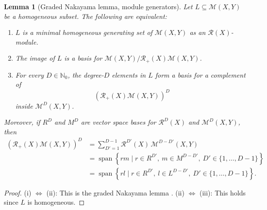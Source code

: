 \documentclass[11pt]{article}
\newcommand{\dsN}{\mathbb{N}}
\newcommand{\scM}{\mathcal{M}}
\newcommand{\scR}{\mathcal{R}}
\newcommand{\Span}{\operatorname{span}}
\newcommand{\set}[1]{\{#1\}}
\newtheorem{lemma}[theorem]{Lemma}
\theoremstyle{definition}
\begin{document}
\begin{lemma}[Graded Nakayama lemma, module generators]\label{lem:module-generators}
  Let $L\subseteq \scM(X,Y)$ be a homogeneous subset. The following are equivalent:
  \begin{enumerate}[label=\textup{(\roman*)}, leftmargin=2em]
    \item $L$ is a minimal homogeneous generating set of $\scM(X,Y)$ as an $\scR(X)$-module.
    \item The image of $L$ is a basis for $\scM(X,Y)\big/\scR_{+}(X)\scM(X,Y)$.
    \item For every $D\in\dsN_0$, the degree-$D$ elements in $L$ form a basis for a complement of
    \[
      \left(\scR_{+}(X)\scM(X,Y)\right)^D
    \]
    inside $\scM^D(X,Y)$.
  \end{enumerate}
  Moreover, if $R^D$ and $M^D$ are vector space bases for $\scR^{D}(X)$ and $\scM^D(X,Y)$, then
  \[
    \begin{aligned}
      \left(\scR_{+}(X)\scM(X,Y)\right)^D
      &=
      \sum_{D'=1}^{D-1} \scR^{D'}(X)\,\scM^{D-D'}(X,Y) \\
      &=
      \Span\left\{r m \mid r \in R^{D'},\ m \in M^{D-D'},\ D' \in \set{1,\dots,D-1}\right\} \\
      &=
      \Span\left\{r l \mid r \in R^{D'},\ l \in L^{D-D'},\ D' \in \set{1,\dots,D-1}\right\}.
    \end{aligned}
  \]
\end{lemma}
\begin{proof}
  \textup{(i)} $\iff$ \textup{(ii)}: This is the graded Nakayama lemma \cite[Lemma 10.56.1]{Stacks0EKB}. \textup{(ii)} $\iff$ \textup{(iii)}: This holds since $L$ is homogeneous.
\end{proof}
\end{document}
